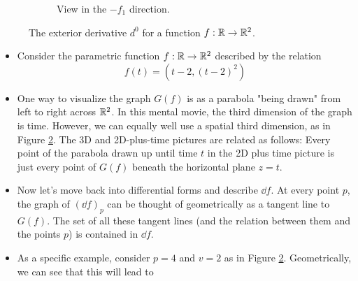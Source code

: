 \documentclass[../notes.tex]{subfiles}
\begin{document}
\begin{itemize}
\begin{figure}[h!]
\begin{subfigure}[b]{0.66\linewidth}
            \caption{View in the $-f_1$ direction.}
            \label{fig:exteriorDerivativeRR2c}
        \end{subfigure}
        \caption{The exterior derivative $d^0$ for a function $f:\mathbb{R}\to\mathbb{R}^2$.}
        \label{fig:exteriorDerivativeRR2}
    \end{figure}
    \begin{itemize}
        \item Consider the parametric function $f:\mathbb{R}\to\mathbb{R}^2$ described by the relation
        \begin{equation*}
            f(t) = \left( t-2,(t-2)^2 \right)
        \end{equation*}
        \item One way to visualize the graph $G(f)$ is as a parabola "being drawn" from left to right across $\mathbb{R}^2$. In this mental movie, the third dimension of the graph is time. However, we can equally well use a spatial third dimension, as in Figure \ref{fig:exteriorDerivativeRR2}. The 3D and 2D-plus-time pictures are related as follows: Every point of the parabola drawn up until time $t$ in the 2D plus time picture is just every point of $G(f)$ beneath the horizontal plane $z=t$.
        \item Now let's move back into differential forms and describe $\dd{f}$. At every point $p$, the graph of $(\dd{f})_p$ can be thought of geometrically as a tangent line to $G(f)$. The set of all these tangent lines (and the relation between them and the points $p$) is contained in $\dd{f}$.
        \item As a specific example, consider $p=4$ and $v=2$ as in Figure \ref{fig:exteriorDerivativeRR2}. Geometrically, we can see that this will lead to

\end{itemize}
\end{itemize}
\end{document}
